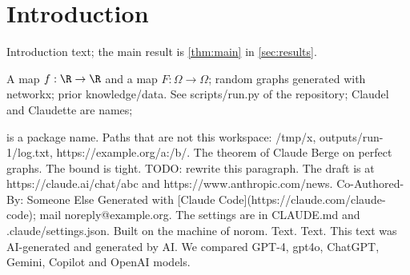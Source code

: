 \section{Introduction}
\label{sec:introduction}

Introduction text; the main result is \cref{thm:main} in \cref{sec:results}.

A map $f:\R\to\R$ and a map $F:\Omega\to\Omega$; random graphs generated with networkx; prior knowledge/data.
See scripts/run.py of the repository; Claudel and Claudette are names; \usepackage{todonotes} is a package name.
Paths that are not this workspace: /tmp/x, outputs/run-1/log.txt, https://example.org/a:/b/.
The theorem of Claude Berge on perfect graphs.
The bound is tight. %
TODO: rewrite this paragraph.
The draft is at https://claude.ai/chat/abc and https://www.anthropic.com/news.
Co-Authored-By: Someone Else
Generated with [Claude Code](https://claude.com/claude-code); mail noreply@example.org.
The settings are in CLAUDE.md and .claude/settings.json.
Built on the machine of norom.
Text. %
Text. %
This text was AI-generated and generated by AI.
We compared GPT-4, gpt4o, ChatGPT, Gemini, Copilot and OpenAI models.
